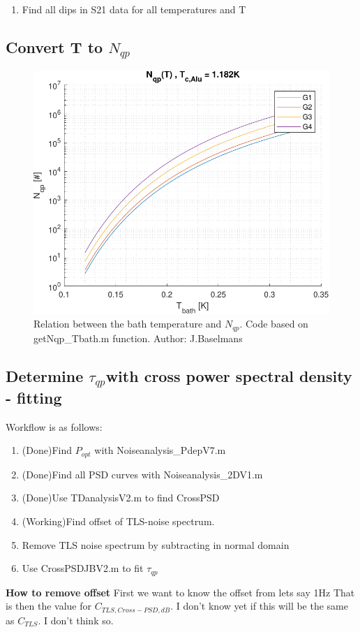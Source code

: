 \begin{enumerate}
	\item Find all dips in S21 data for all temperatures and T
\end{enumerate}


\subsection*{Convert T to $N_{qp}$}

\begin{figure}[ht]
	\centering
	\includegraphics[width=\linewidth]{figures/ch5_measurement/N_qp_funcT.pdf}
	\caption{Relation between the bath temperature and $N_{qp}$. Code based on getNqp\_Tbath.m function. Author: J.Baselmans}
	\label{fig:}
\end{figure}

\subsection*{Determine $\tau_{qp} $with cross power spectral density - fitting}
Workflow is as follows:
\begin{enumerate}
	\item (Done)Find $P_{opt}$ with Noiseanalysis\_PdepV7.m
	\item (Done)Find all PSD curves with Noiseanalysis\_2DV1.m
	\item (Done)Use TDanalysisV2.m to find CrossPSD
	\item (Working)Find offset of TLS-noise spectrum.
	\item Remove TLS noise spectrum by subtracting in normal domain
	\item Use CrossPSDJBV2.m to fit $\tau_{qp}$
\end{enumerate}
\textbf{How to remove offset}
First we want to know the offset from lets say 1Hz
That is then the value for $C_{TLS,Cross-PSD,dB}$. I don't know yet if this will be the same as $C_{TLS}$. I don't think so. 

